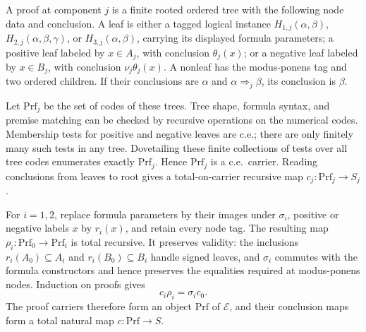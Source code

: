 \documentclass[11pt]{article}
\begin{document}
A proof at component $j$ is a finite rooted ordered tree with
the following node data and conclusion. A leaf is either a
tagged logical instance $H_{1,j}(\alpha,\beta)$,
$H_{2,j}(\alpha,\beta,\gamma)$, or
$H_{3,j}(\alpha,\beta)$, carrying its displayed formula
parameters; a positive leaf labeled by $x\in A_j$, with
conclusion $\theta_j(x)$; or a negative leaf labeled by
$x\in B_j$, with conclusion $\nu_j\theta_j(x)$.
A nonleaf has the modus-ponens tag and two ordered children.
If their conclusions are $\alpha$ and
$\alpha\Rightarrow_j\beta$, its conclusion is $\beta$.

Let $\mathrm{Prf}_j$ be the set of codes of these trees.
Tree shape, formula syntax, and premise matching can be checked
by recursive operations on the numerical codes. Membership tests
for positive and negative leaves are c.e.; there are only finitely
many such tests in any tree. Dovetailing these finite collections
of tests over all tree codes enumerates exactly $\mathrm{Prf}_j$.
Hence $\mathrm{Prf}_j$ is a c.e.\ carrier.
Reading conclusions from leaves to root gives a total-on-carrier
recursive map $c_j:\mathrm{Prf}_j\to S_j$.

For $i=1,2$, replace formula parameters by their images under
$\sigma_i$, positive or negative labels $x$ by $r_i(x)$, and
retain every node tag. The resulting map
$\rho_i:\mathrm{Prf}_0\to\mathrm{Prf}_i$ is total recursive.
It preserves validity: the inclusions $r_i(A_0)\subseteq A_i$
and $r_i(B_0)\subseteq B_i$ handle signed leaves, and
$\sigma_i$ commutes with the formula constructors and hence
preserves the equalities required at modus-ponens nodes.
Induction on proofs gives
\[
 c_i\rho_i=\sigma_i c_0.
\]
The proof carriers therefore form an object $\mathrm{Prf}$ of
$\mathcal E$, and their conclusion maps form a total natural map
$c:\mathrm{Prf}\to S$.
\end{document}
